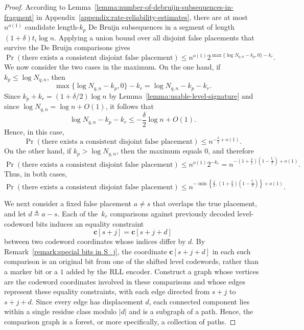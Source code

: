 \documentclass[journal,letterpaper,onecolumn,11pt]{IEEEtran}
\newcommand{\boldc}{\mathbf{c}}
\begin{document}
\begin{proof}
According to
Lemma~\ref{lemma:number-of-debruijn-subsequences-in-fragment} in Appendix~\ref{appendix:rate-reliability-estimates}, there are
at most \(n^{o(1)}\) candidate length-\(k_p\) De Bruijn subsequences in
a segment of length \((1+\delta)t_i\log n\).
Applying a union bound over all disjoint false placements that survive
the De Bruijn comparisons gives
\[
\Pr\left(
\text{there exists a consistent disjoint false placement}
\right)
\leq
n^{o(1)}
2^{\max\{\log N_{q,n}-k_p,0\}-k_r}.
\]
We now consider the two cases in the maximum.
On the one hand, if \(k_p\leq\log N_{q,n}\), then
\[
\max\{\log N_{q,n}-k_p,0\}-k_r
=
\log N_{q,n}-k_p-k_r.
\]
Since
\(k_p+k_r=(1+\delta/2)\log n\) by Lemma~\ref{lemma:usable-level-signature} and since \(\log N_{q,n}=\log n+O(1)\), it follows that
\[
\log N_{q,n}-k_p-k_r
\leq
-\frac{\delta}{2}\log n+O(1).
\]
Hence, in this case,
\[
\Pr\left(
\text{there exists a consistent disjoint false placement}
\right)
\leq
n^{-\frac{\delta}{2}+o(1)}.
\]
On the other hand, if \(k_p>\log N_{q,n}\), then the maximum equals \(0\), and therefore
\[
\Pr\left(
\text{there exists a consistent disjoint false placement}
\right)
\leq
n^{o(1)}2^{-k_r}
=
n^{-\left(1+\frac{\delta}{2}\right)
\left(1-\frac{t_i}{T}\right)+o(1)}.
\]
Thus, in both cases,
\begin{equation}\label{equation:disjoint false placement}
    \Pr\left(
\text{there exists a consistent disjoint false placement}
\right)
\leq
n^{-\min\left\{
\frac{\delta}{2},
\left(1+\frac{\delta}{2}\right)
\left(1-\frac{t_i}{T}\right)
\right\}+o(1)}.
\end{equation}



We next consider a fixed false placement \(a\neq s\) that overlaps the
true placement, and let \(d\triangleq a-s\). Each of the~\(k_r\)
comparisons against previously decoded level-codeword bits induces an
equality constraint
\[
\boldc[s+j]=\boldc[s+j+d]
\]
between two codeword coordinates whose indices differ by \(d\). By
Remark~\ref{remark:special bits in S_j}, the coordinate
\(\boldc[s+j+d]\) in each such comparison is an original bit from one
of the shifted level codewords, rather than a marker bit or a \(1\)
added by the RLL encoder.
Construct a graph whose vertices are the codeword coordinates involved
in these comparisons and whose edges represent these equality
constraints, with each edge directed from \(s+j\) to \(s+j+d\).
Since every edge has displacement \(d\), each connected component lies
within a single residue class modulo \(|d|\) and is a subgraph of a
path. Hence, the comparison graph is a forest, or more specifically, a
collection of paths.


\end{proof}
\end{document}
